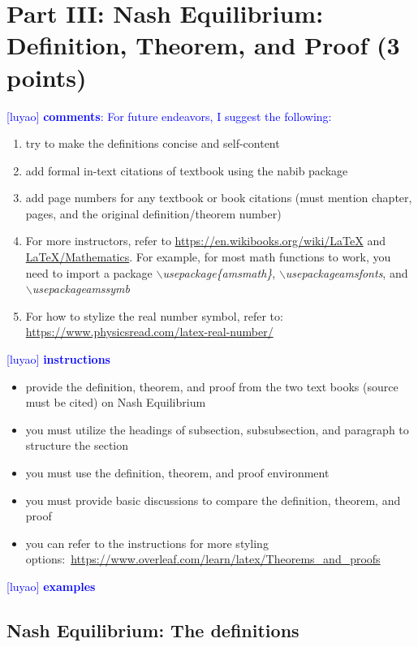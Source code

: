 \documentclass[runningheads]{llncs}
\newcommand{\luyao}[1]{\textcolor{blue}{[luyao] #1}}
\newcommand{\luyao}[1]{}
\begin{document}
\section{Part III: Nash Equilibrium: Definition, Theorem, and Proof (3 points)}

\luyao{\textbf{comments}: For future endeavors, I suggest the following:}
\begin{enumerate}
    \item try to make the definitions concise and self-content
    \item add formal in-text citations of textbook using the nabib package
    \item add page numbers for any textbook or book citations (must mention chapter, pages, and the original definition/theorem number)
    \item For more instructors, refer to \href{https://en.wikibooks.org/wiki/LaTeX}{https://en.wikibooks.org/wiki/LaTeX} and \href{https://en.wikibooks.org/wiki/LaTeX/Mathematics}{LaTeX/Mathematics}. For example, for most math functions to work, you need to import a package \textit{$\backslash$usepackage\{amsmath\}}, \textit{$\backslash$usepackage{amsfonts}}, and \textit{$\backslash$usepackage{amssymb}}
    \item For how to stylize the real number symbol, refer to: \url{https://www.physicsread.com/latex-real-number/}
\end{enumerate}


\noindent\luyao{\textbf{instructions}}

\begin{itemize}
    \item provide the definition, theorem, and proof from the two text books (source must be cited) on Nash Equilibrium
    \item you must utilize the headings of subsection, subsubsection, and paragraph to structure the section
    \item you must use the definition, theorem, and proof environment
    \item you must provide basic discussions to compare the definition, theorem, and proof 
    \item you can refer to the instructions for more styling options:~\url{https://www.overleaf.com/learn/latex/Theorems_and_proofs}
\end{itemize}



\newpage
\noindent\luyao{\textbf{examples}}
\subsection{Nash Equilibrium: The definitions}
\end{document}

